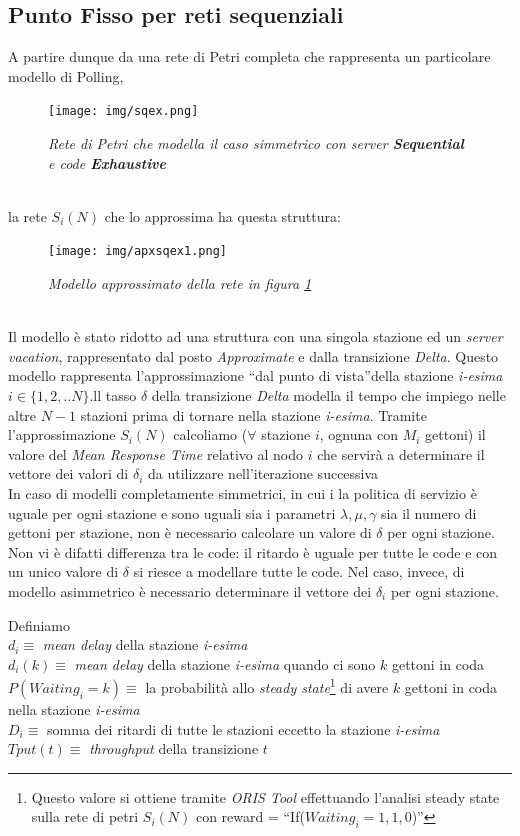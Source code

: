 \documentclass[12pt,a4paper,italian]{article}
\begin{document}
\subsection{Punto Fisso per reti sequenziali}
A partire dunque da una rete di Petri completa che rappresenta un particolare modello di Polling,
\begin{figure}[!h]
	\centering
	\texttt{[image: img/sqex.png]}
	\caption{\emph{Rete di Petri che modella il caso simmetrico con server \textbf{Sequential} e code \textbf{Exhaustive}}}
	\label{sqex}
\end{figure}\\
\newpage
la rete $S_i(N)$ che lo approssima ha questa struttura:
\begin{figure}[!h]
	\centering
	\texttt{[image: img/apxsqex1.png]}
	\caption{\emph{Modello approssimato della rete in figura \ref{sqex}}}
	\label{apxsqex}
\end{figure}\\
Il modello è stato ridotto ad una struttura con una singola stazione ed un \emph{server vacation}, rappresentato dal posto \emph{Approximate} e dalla transizione \emph{Delta}.
Questo modello rappresenta l'approssimazione \textquotedblleft dal punto di vista\textquotedblright  della stazione \emph{i-esima} $i \in \{1,2,..N\}$.ll tasso $\delta$ della transizione \emph{Delta} modella il tempo che impiego nelle altre $N-1$ stazioni prima di tornare nella stazione \emph{i-esima}.
Tramite l'approssimazione $S_i(N)$ calcoliamo ($\forall$ stazione $i$, ognuna con $M_i$ gettoni) il valore del \emph{Mean Response Time} relativo al nodo $i$ che servirà a determinare il vettore dei valori di $\delta_i$ da utilizzare nell'iterazione successiva
\\In caso di modelli completamente simmetrici, in cui i la politica di servizio è uguale per ogni stazione e sono uguali sia i parametri $\lambda, \mu, \gamma$ sia il numero di gettoni per stazione, non è necessario calcolare un valore di $\delta$ per ogni stazione. Non vi è difatti differenza tra le code: il ritardo è uguale per tutte le code e con un unico valore di $\delta$ si riesce a modellare tutte le code. Nel caso, invece, di modello asimmetrico è necessario determinare il vettore dei  $\delta_i$ per ogni stazione.\\
\newpage

Definiamo\\
$d_i \equiv$ \emph{mean delay} della stazione \emph{i-esima}\\
$d_i(k) \equiv$  \emph{mean delay} della stazione \emph{i-esima} quando ci sono $k$ gettoni in coda\\
$P(Waiting_i=k) \equiv$ la probabilità allo \emph{steady state}\footnote{Questo valore si ottiene tramite \emph{ORIS Tool} effettuando l'analisi steady state sulla rete di petri $S_i(N)$ con reward = \textquotedblleft If($Waiting_i=1,1,0$)\textquotedblright } di avere $k$ gettoni in coda nella stazione \emph{i-esima}\\
$D_i \equiv$ somma dei ritardi di tutte le stazioni eccetto la stazione \emph{i-esima} \\
$Tput(t) \equiv$ \emph{throughput} della transizione $t$\\
\end{document}
